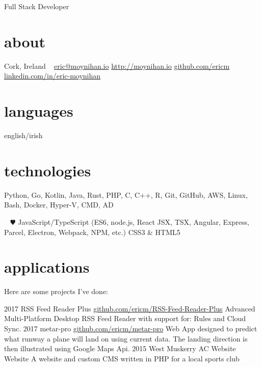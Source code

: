 \documentclass[]{friggeri-cv}
\begin{document}
       {Full Stack Developer}


\begin{aside}
  \section{about}
    Cork,
    Ireland
    ~
    \href{mailto:eric@moynihan.io}{eric@moynihan.io}
    \href{http://moynihan.io}{http://moynihan.io}
    \href{http://github.com/ericm}{github.com/ericm}
    \href{https://www.linkedin.com/in/eric-moynihan}{linkedin.com/in/eric-moynihan}
  \section{languages}
    english/irish
  \section{technologies}
    Python, Go, Kotlin,
    Java, Rust, PHP,
    C, C++, R,
    Git, GitHub, AWS,
    Linux, Bash, Docker,
    Hyper-V, CMD, AD
    
    ~
    {\color{red} $\varheartsuit$} JavaScript/TypeScript
    (ES6, node.js, React JSX, TSX, Angular, Express, Parcel, Electron, Webpack, NPM, etc.)
    CSS3 \& HTML5
    
\end{aside}

\section{applications}

Here are some projects I've done:

\begin{entrylist}
  \entry
    {2017}
    {RSS Feed Reader Plus}
    {\href{https://github.com/ericm/RSS-Feed-Reader-Plus}{github.com/ericm/RSS-Feed-Reader-Plus}}
    {Advanced Multi-Platform Desktop RSS Feed Reader with support for: Rules and Cloud Sync.}
  \entry
    {2017}
    {metar-pro}
    {\href{https://github.com/ericm/metar-pro}{github.com/ericm/metar-pro}}
    {Web App designed to predict what runway a plane will land on using current data. The landing direction is then illustrated using Google Maps Api.}
  \entry
    {2015}
    {West Muskerry AC Website}
    {Website}
    {A website and custom CMS written in PHP for a local sports club}

\end{entrylist}
\end{document}
